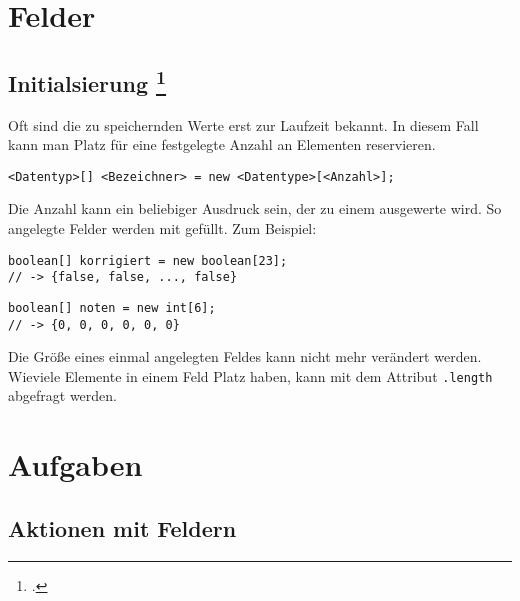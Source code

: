\documentclass{lehramt-informatik-haupt}
\begin{document}

\chapter{Felder}

\section{Initialsierung
\footcite[Seite 46]{oomup:fs:3}}

Oft sind die zu speichernden Werte erst zur Laufzeit bekannt. In diesem
Fall kann man Platz für eine festgelegte Anzahl an Elementen
reservieren.

\texttt{<Datentyp>[] <Bezeichner> = new <Datentype>[<Anzahl>];}

Die Anzahl kann ein beliebiger Ausdruck sein, der zu einem 
ausgewerte wird. So angelegte Felder werden mit 
gefüllt. Zum Beispiel:

\begin{verbatim}
boolean[] korrigiert = new boolean[23];
// -> {false, false, ..., false}
\end{verbatim}

\begin{verbatim}
boolean[] noten = new int[6];
// -> {0, 0, 0, 0, 0, 0}
\end{verbatim}

Die Größe eines einmal angelegten Feldes kann nicht mehr verändert
werden. Wieviele Elemente in einem Feld Platz haben, kann mit dem
Attribut \texttt{.length} abgefragt werden.


\chapter{Aufgaben}

\section{Aktionen mit Feldern}
\end{document}
